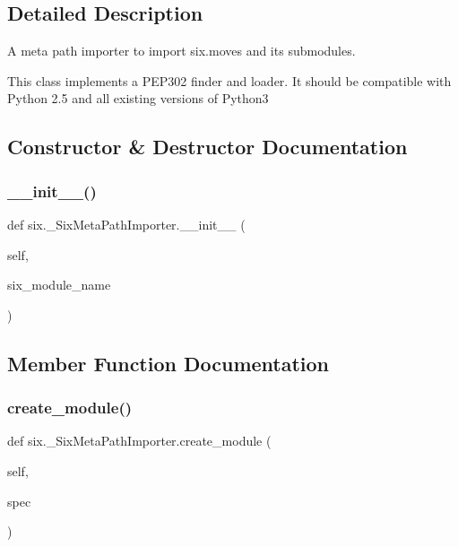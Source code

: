 \subsection{Detailed Description}
\begin{DoxyVerb}A meta path importer to import six.moves and its submodules.

This class implements a PEP302 finder and loader. It should be compatible
with Python 2.5 and all existing versions of Python3
\end{DoxyVerb}
 

\subsection{Constructor \& Destructor Documentation}
\mbox{\label{classsix_1_1__SixMetaPathImporter_af0274fb3033e7c7668e90a5acf89547a}} 
\subsubsection{\texorpdfstring{\+\_\+\+\_\+init\+\_\+\+\_\+()}{\_\_init\_\_()}}
{\footnotesize\ttfamily def six.\+\_\+\+Six\+Meta\+Path\+Importer.\+\_\+\+\_\+init\+\_\+\+\_\+ (\begin{DoxyParamCaption}\item[{}]{self,  }\item[{}]{six\+\_\+module\+\_\+name }\end{DoxyParamCaption})}



\subsection{Member Function Documentation}
\mbox{\label{classsix_1_1__SixMetaPathImporter_a69596da7d0e25f87906245a51319b0b2}} 
\subsubsection{\texorpdfstring{create\+\_\+module()}{create\_module()}}
{\footnotesize\ttfamily def six.\+\_\+\+Six\+Meta\+Path\+Importer.\+create\+\_\+module (\begin{DoxyParamCaption}\item[{}]{self,  }\item[{}]{spec }\end{DoxyParamCaption})}

